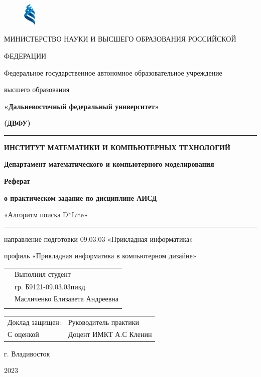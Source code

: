 \documentclass[12pt]{article}
\begin{document}
\begin{titlepage}
\begin{figure}
    \begin{center}
        \includegraphics[width=0.06\textwidth]{img/znachok_dvfu.png}
    \end{center}
\end{figure}
\thispagestyle{empty}

\begin{small}

\renewcommand{\baselinestretch}{2.0} %
\centerline{\large{МИНИСТЕРСТВО НАУКИ И ВЫСШЕГО ОБРАЗОВАНИЯ РОССИЙСКОЙ}}
\centerline{\large{ФЕДЕРАЦИИ}}
\centerline{Федеральное государственное автономное образовательное учреждение}
\centerline{высшего образования}
\centerline{\textbf{«Дальневосточный федеральный университет»}}
\centerline{\textbf{(ДВФУ)}}

\noindent\rule{\textwidth}{4pt}
\specialrule{.1em}{.05em}{.05em}

\centerline{\textbf{ИНСТИТУТ МАТЕМАТИКИ И КОМПЬЮТЕРНЫХ ТЕХНОЛОГИЙ}}
\centerline{\textbf{Департамент математического и компьютерного моделирования}}

\vfill

\vfill

\centerline{\textbf{Реферат}}
\centerline{\textbf{о практическом задание по дисциплине АИСД}}
\centerline{«Алгоритм поиска D*Lite»}
\par\noindent\rule{\textwidth}{0.3pt}
\centerline{направление подготовки 09.03.03 «Прикладная информатика»}
\centerline{профиль «Прикладная информатика в компьютерном дизайне»}

\vfill

\vfill

\noindent
\begin{tabular}{p{} p{}}
 & Выполнил студент  \\
 &  гр. Б9121-09.03.03пикд \\
 & Масличенко Елизавета Андреевна  \\
 & \parindent0pt \\
\end{tabular}

\vfill
\noindent
\begin{tabular}{p{} p{}}
 Доклад защищен:& Руководитель практики  \\
 С оценкой \hrulefill & Доцент ИМКТ А.С Кленин  \\
 
\end{tabular}

\noindent


\vfill

\centerline{г. Владивосток}
\centerline{2023}
\clearpage
\end{small}
\end{titlepage}
\end{document}
